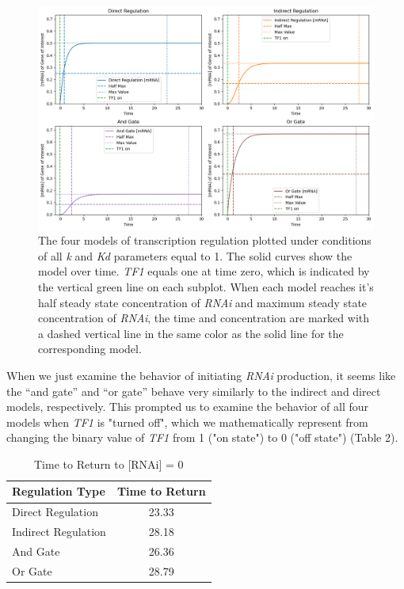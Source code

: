 \documentclass{article}
\begin{document}
\begin{figure}[hp]
    \centering
    \includegraphics[width=1\textwidth]{figure2.png}
    \caption{The four models of transcription regulation plotted under conditions of all \textit{k} and \textit{Kd} parameters equal to 1. The solid curves show the model over time. \textit{TF1} equals one at time zero, which is indicated by the vertical green line on each subplot. When each model reaches it's half steady state concentration of \textit{RNAi} and maximum steady state concentration of \textit{RNAi}, the time and concentration are marked with a dashed vertical line in the same color as the solid line for the corresponding model.}
\end{figure}

When we just examine the behavior of initiating \textit{RNAi} production, it seems like the ``and gate'' and ``or gate'' behave very similarly to the indirect and direct models, respectively. This prompted us to examine the behavior of all four models when \textit{TF1} is "turned off", which we mathematically represent from changing the binary value of \textit{TF1} from 1 ("on state") to 0 ("off state") (Table 2). 

\begin{table}[h]
    \centering
    \caption{Time to Return to [RNAi] = 0}
    \begin{tabular}{@{}lc@{}}
        \toprule
        \textbf{Regulation Type} & \textbf{Time to Return} \\ 
        \midrule
        Direct Regulation & 23.33 \\ 
        Indirect Regulation & 28.18 \\ 
        And Gate & 26.36 \\ 
        Or Gate & 28.79 \\ 
        \bottomrule
    \end{tabular}
\end{table}
\end{document}
